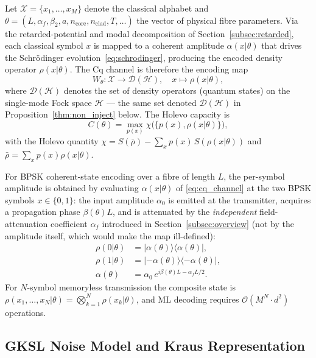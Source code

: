 \documentclass[journal,twocolumn]{IEEEtran}
\theoremstyle{definition}
\theoremstyle{plain}
\newcommand{\calH}{\mathcal{H}}
\newcommand{\alphaf}{\alpha_{f}}
\begin{document}
Let $\mathcal{X} = \{x_1, \dots, x_M\}$ denote the classical
alphabet and $\theta = (L, \alphaf, \beta_2, a, n_{\mathrm{core}},
n_{\mathrm{clad}}, T, \ldots)$ the vector of physical fibre
parameters.  Via the retarded-potential and modal decomposition of
Section~\ref{subsec:retarded}, each classical symbol $x$ is mapped
to a coherent amplitude $\alpha(x|\theta)$ that drives the
Schr\"{o}dinger evolution~\eqref{eq:schrodinger}, producing the
encoded density operator $\rho(x|\theta)$.  The Cq channel is
therefore the encoding map
\begin{equation}
  W_\theta : \mathcal{X} \to \mathcal{D}(\calH), \quad
  x \mapsto \rho(x|\theta),
  \label{eq:cq_channel}
\end{equation}
where $\mathcal{D}(\calH)$ denotes the set of density operators
(quantum states) on the single-mode Fock space $\calH$ --- the same
set denoted $\mathcal{D}(\calH)$ in Proposition~\ref{thm:non_inject}
below. The Holevo capacity is
\begin{equation}
  C(\theta) = \max_{p(x)} \chi\bigl(\{p(x), \rho(x|\theta)\}\bigr),
  \label{eq:holevo_capacity}
\end{equation}
with the Holevo quantity
$\chi = S(\bar\rho) - \sum_x p(x)\, S(\rho(x|\theta))$ and
$\bar\rho = \sum_x p(x)\rho(x|\theta)$.

For BPSK coherent-state encoding over a fibre of length $L$, the
per-symbol amplitude is obtained by evaluating $\alpha(x|\theta)$ of
\eqref{eq:cq_channel} at the two BPSK symbols $x\in\{0,1\}$: the
input amplitude $\alpha_0$ is emitted at the transmitter, acquires a
propagation phase $\beta(\theta)L$, and is attenuated by the
\emph{independent} field-attenuation coefficient $\alphaf$ introduced
in Section~\ref{subsec:overview} (not by the amplitude itself, which
would make the map ill-defined):
\begin{align}
  \rho(0|\theta) &= |\alpha(\theta)\rangle\langle\alpha(\theta)|,
  \nonumber\\
  \rho(1|\theta) &= |-\alpha(\theta)\rangle\langle-\alpha(\theta)|,
  \label{eq:bpsk}\\
  \alpha(\theta) &= \alpha_0\,e^{i\beta(\theta)L - \alphaf L/2}.
  \nonumber
\end{align}
For $N$-symbol memoryless transmission the composite state is
$\rho(x_1,\dots,x_N|\theta) = \bigotimes_{k=1}^N \rho(x_k|\theta)$,
and ML decoding requires $\mathcal{O}(M^N \cdot d^2)$ operations.

\subsection{GKSL Noise Model and Kraus Representation}
\end{document}
